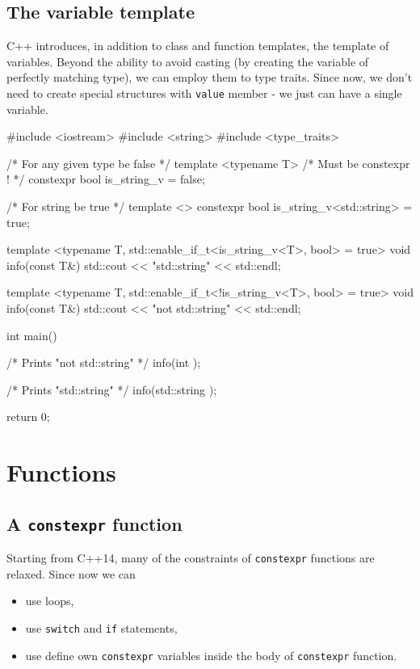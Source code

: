 \documentclass[../main]{subfiles}
\begin{document}
\subsection{The variable template}
    C++ introduces, in addition to class and function templates, the template of variables. Beyond the ability to avoid
casting (by creating the variable of perfectly matching type), we can employ them to type traits. Since now, we don't need
to create special structures with \texttt{value} member - we just can have a single variable.
\begin{Code}
    #include <iostream>
    #include <string>
    #include <type_traits>
    
    /* For any given type be false */
    template <typename T>
    /* Must be constexpr ! */
    constexpr bool is_string_v = false;
    
    /* For string be true */
    template <>
    constexpr bool is_string_v<std::string> = true;
    
    template <typename T,
              std::enable_if_t<is_string_v<T>, bool> = true>
    void info(const T&)
    {
        std::cout << "std::string" << std::endl;
    }
    
    template <typename T,
              std::enable_if_t<!is_string_v<T>, bool> = true>
    void info(const T&)
    {
        std::cout << "not std::string" << std::endl;
    }
    
    int main()
    {
        /* Prints "not std::string" */
        info(int {});

        /* Prints "std::string" */
        info(std::string {});
    
        return 0;
    }
\end{Code}

\section{Functions}
\subsection{A \texttt{constexpr} function}
    Starting from C++14, many of the constraints of \texttt{constexpr} functions are relaxed. Since now we can
\begin{itemize}
    \item use loops,
    \item use \texttt{switch} and \texttt{if} statements,
    \item use define own \texttt{constexpr} variables inside the body of \texttt{constexpr} function.
\end{itemize}
\end{document}
